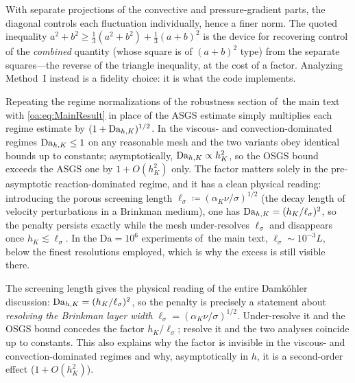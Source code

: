 \begin{pedagogy}
With separate projections of the convective and pressure-gradient parts, the
diagonal controls each fluctuation individually, hence a finer norm. The quoted
inequality $a^2+b^2 \ge \tfrac13(a^2+b^2)+\tfrac13(a+b)^2$ is the device for
recovering control of the \emph{combined} quantity (whose square is of
$(a+b)^2$ type) from the separate squares---the reverse of the triangle
inequality, at the cost of a factor. Analyzing Method~I instead is a fidelity
choice: it is what the code implements.
\end{pedagogy}

\begin{remark}
\label{oa:rem:robustness}
Repeating the regime normalizations of the robustness section of~the main text
with \cref{oa:eq:MainResult} in place of the ASGS estimate simply multiplies each regime
estimate by $(1+\mathrm{Da}_{h,K})^{1/2}$. In the viscous- and convection-dominated regimes
$\mathrm{Da}_{h,K} \le 1$ on any reasonable mesh and the two variants obey identical bounds up to
constants; asymptotically, $\mathrm{Da}_{h,K} \propto h_K^2$, so the OSGS bound exceeds the ASGS
one by $1 + O(h_K^2)$ only. The factor matters solely in the pre-asymptotic
reaction-dominated regime, and it has a clean physical reading: introducing the
porous screening length $\ell_\sigma \coloneqq (\alpha_K\nu/\sigma)^{1/2}$ (the decay
length of velocity perturbations in a Brinkman medium), one has
$\mathrm{Da}_{h,K} = (h_K/\ell_\sigma)^2$, so the penalty persists exactly while the mesh
under-resolves $\ell_\sigma$ and disappears once $h_K \lesssim \ell_\sigma$. In the
$\mathrm{Da} = 10^6$ experiments of~the main text, $\ell_\sigma \sim 10^{-3}L$,
below the finest resolutions employed, which is why the excess is still visible there.
\end{remark}

\begin{pedagogy}
The screening length gives the physical reading of the entire Damk\"ohler
discussion: $\mathrm{Da}_{h,K} = (h_K/\ell_\sigma)^2$, so the penalty is precisely a
statement about \emph{resolving the Brinkman layer width} $\ell_\sigma =
(\alpha_K\nu/\sigma)^{1/2}$. Under-resolve it and the OSGS bound concedes the
factor $h_K/\ell_\sigma$; resolve it and the two analyses coincide up to
constants. This also explains why the factor is invisible in the viscous- and
convection-dominated regimes and why, asymptotically in $h$, it is a
second-order effect ($1 + O(h_K^2)$).
\end{pedagogy}

